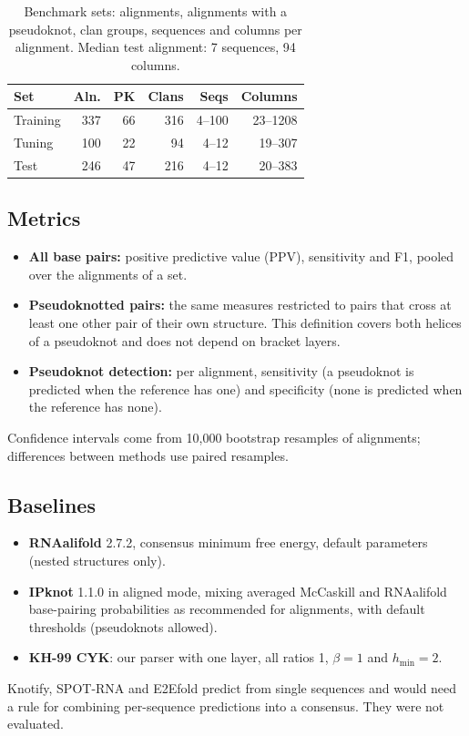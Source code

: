 \documentclass[10pt, twocolumn]{article}
\newcommand{\hmin}{h_{\min}}
\begin{document}
\begin{table}[h]
\centering\small
\setlength{\tabcolsep}{3pt}
\begin{tabular}{lrrrrr}
\toprule
\textbf{Set} & \textbf{Aln.} & \textbf{PK} & \textbf{Clans} & \textbf{Seqs} & \textbf{Columns}\\
\midrule
Training & 337 & 66 & 316 & 4--100 & 23--1208\\
Tuning & 100 & 22 & 94 & 4--12 & 19--307\\
Test & 246 & 47 & 216 & 4--12 & 20--383\\
\bottomrule
\end{tabular}
\caption{Benchmark sets: alignments, alignments with a pseudoknot, clan groups, sequences and columns per alignment. Median test alignment: 7 sequences, 94 columns.}
\label{tab:data}
\end{table}

\subsection{Metrics}
\begin{itemize}
    \item \textbf{All base pairs:} positive predictive value (PPV), sensitivity and F1, pooled over the alignments of a set.
    \item \textbf{Pseudoknotted pairs:} the same measures restricted to pairs that cross at least one other pair of their own structure. This definition covers both helices of a pseudoknot and does not depend on bracket layers.
    \item \textbf{Pseudoknot detection:} per alignment, sensitivity (a pseudoknot is predicted when the reference has one) and specificity (none is predicted when the reference has none).
\end{itemize}
Confidence intervals come from 10{,}000 bootstrap resamples of alignments; differences between methods use paired resamples.

\subsection{Baselines}
\begin{itemize}
    \item \textbf{RNAalifold} 2.7.2, consensus minimum free energy, default parameters (nested structures only).
    \item \textbf{IPknot} 1.1.0 in aligned mode, mixing averaged McCaskill and RNAalifold base-pairing probabilities as recommended for alignments, with default thresholds (pseudoknots allowed).
    \item \textbf{KH-99 CYK}: our parser with one layer, all ratios 1, $\beta=1$ and $\hmin=2$.
\end{itemize}
Knotify, SPOT-RNA and E2Efold predict from single sequences and would need a rule for combining per-sequence predictions into a consensus. They were not evaluated.
\end{document}

